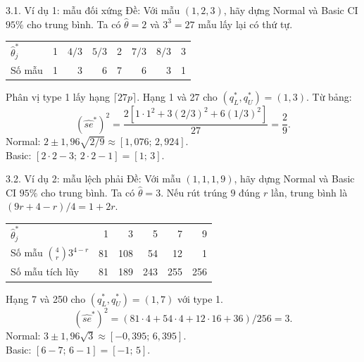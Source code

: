 \documentclass[aspectratio=43,10pt]{beamer}
\newcommand{\slidesource}{}
\begin{document}
\renewcommand{\slidesource}{Nguồn: Báo cáo nhóm D, tr. 11, Bảng 5.1}
\begin{frame}{3.1. Ví dụ 1: mẫu đối xứng}
    \small
    Đề: Với mẫu $(1,2,3)$, hãy dựng Normal và Basic CI $95\%$ cho trung bình. Ta có $\hat\theta=2$ và $3^3=27$ mẫu lấy lại có thứ tự.
    \medskip

    \centering
    \begin{tabular}{lrrrrrrr}
    \toprule $\hat\theta_j^*$ & 1 & $4/3$ & $5/3$ & 2 & $7/3$ & $8/3$ & 3\\
    Số mẫu & 1 & 3 & 6 & 7 & 6 & 3 & 1\\ \bottomrule
    \end{tabular}\par
    \raggedright\medskip
    Phân vị type 1 lấy hạng $\lceil 27p\rceil$. Hạng 1 và 27 cho $(q_L^*,q_U^*)=(1,3)$. Từ bảng:
    \[
    (\widehat{se}^*)^2=\frac{2[1\cdot1^2+3(2/3)^2+6(1/3)^2]}{27}=\frac29.
    \]
    Normal: $2\pm1{,}96\sqrt{2/9}\approx[1{,}076;\,2{,}924]$.\\
    Basic: $[2\cdot2-3;\,2\cdot2-1]=[1;\,3]$.
\end{frame}

\renewcommand{\slidesource}{Nguồn: Báo cáo nhóm D, tr. 11, Bảng 5.1}
\begin{frame}{3.2. Ví dụ 2: mẫu lệch phải}
    \small
    Đề: Với mẫu $(1,1,1,9)$, hãy dựng Normal và Basic CI $95\%$ cho trung bình. Ta có $\hat\theta=3$. Nếu rút trúng $9$ đúng $r$ lần, trung bình là $(9r+4-r)/4=1+2r$.
    \medskip

    \centering
    \begin{tabular}{lrrrrr}
    \toprule $\hat\theta_j^*$ & 1 & 3 & 5 & 7 & 9\\
    Số mẫu $\binom{4}{r}3^{4-r}$ & 81 & 108 & 54 & 12 & 1\\
    Số mẫu tích lũy & 81 & 189 & 243 & 255 & 256\\ \bottomrule
    \end{tabular}\par
    \raggedright\medskip
    Hạng 7 và 250 cho $(q_L^*,q_U^*)=(1,7)$ với type 1.
    \[
    (\widehat{se}^*)^2=(81\cdot4+54\cdot4+12\cdot16+36)/256=3.
    \]
    Normal: $3\pm1{,}96\sqrt3\approx[-0{,}395;\,6{,}395]$.\\
    Basic: $[6-7;\,6-1]=[-1;\,5]$.
\end{frame}
\end{document}

